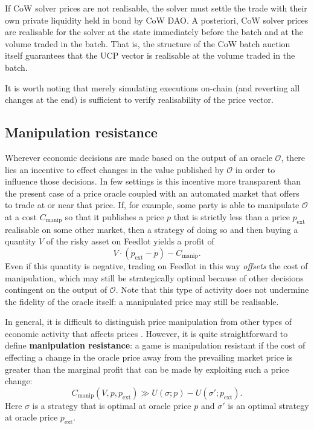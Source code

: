 \documentclass[a4paper,10pt]{article}
\theoremstyle{remark}
\newcommand \oracle {\mathcal{O}}
\begin{document}
If CoW solver prices are not realisable, the solver must settle the trade with their own private liquidity held in bond by CoW DAO.
%
A posteriori, CoW solver prices are realisable for the solver at the state immediately before the batch and at the volume traded in the batch.
%
That is, the structure of the CoW batch auction itself guarantees that the UCP vector is realisable at the volume traded in the batch.

It is worth noting that merely simulating executions on-chain (and reverting all changes at the end) is sufficient to verify realisability of the price vector.

\subsection{Manipulation resistance}

Wherever economic decisions are made based on the output of an oracle $\mathcal{O}$, there lies an incentive to effect changes in the value published by $\mathcal{O}$ in order to influence those decisions. 
%
In few settings is this incentive more transparent than the present case of a price oracle coupled with an automated market that offers to trade at or near that price.
%
If, for example, some party is able to manipulate $\mathcal{O}$ at a cost $C_\mathrm{manip}$ so that it publishes a price $p$ that is strictly less than a price $p_\mathrm{ext}$ realisable on some other market, then a strategy of doing so and then buying a quantity $V$ of the risky asset on Feedlot yields a profit of
\[
  V\cdot (p_\mathrm{ext}-p) - C_\mathrm{manip}.
\]
Even if this quantity is negative, trading on Feedlot in this way \emph{offsets} the cost of manipulation, which may still be strategically optimal because of other decisions contingent on the output of $\oracle$.
%
Note that this type of activity does not undermine the fidelity of the oracle itself: a manipulated price may still be realisable.

In general, it is difficult to distinguish price manipulation from other types of economic activity that affects prices \cite{kyle2008define, zhang2022competition}.
%
However, it is quite straightforward to define \textbf{manipulation resistance}: a game is manipulation resistant if the cost of effecting a change in the oracle price away from the prevailing market price is greater than the marginal profit that can be made by exploiting such a price change:
%
\[
  C_\mathrm{manip}(V,p,p_\mathrm{ext}) \gg U(\sigma;p) - U(\sigma';p_\mathrm{ext}).
\]
Here $\sigma$ is a strategy that is optimal at oracle price $p$ and $\sigma'$ is an optimal strategy at oracle price $p_\mathrm{ext}$.
\end{document}
